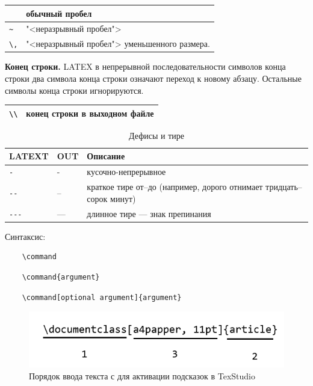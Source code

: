 \begin{table}[h]
    \begin{tabular}{|l|p{}|}
        \hline
                  & обычный пробел \\ \hline
        \verb|~|  & "<неразрывный пробел">\\ \hline
        \verb|\,| & "<неразрывный пробел"> уменьшенного размера.\\
        \hline
    \end{tabular}
\end{table}

\textbf{Конец строки.} LATEX в непрерывной последовательности символов конца строки два символа конца строки означают переход к новому абзацу. Остальные символы конца строки игнорируются.

\begin{table}[ht]
    \begin{tabular}{|l|p{}|}
        \hline
        \verb|\\| & конец строки в выходном файле\\
        \hline
    \end{tabular}
\end{table}

\begin{table}[ht]
    \caption{Дефисы и тире}
    \begin{tabular}{|l|l|p{}|}
        \hline
        \textbf{LATEXT} &
        \textbf{OUT}    &
        \textbf{Описание} \\ \hline
        \verb|-| & - & кусочно-непрерывное \\ \hline
        \verb|--| & -- & краткое тире от--до (например, дорого отнимает тридцать--сорок минут) \\ \hline
        \verb|---| & --- & длинное тире --- знак препинания \\ \hline
    \end{tabular}
\end{table}

\bigskip


\bigskip


Синтаксис:
\begin{verbatim}
    \command
\end{verbatim}

\begin{verbatim}
    \command{argument}
\end{verbatim}

\begin{verbatim}
    \command[optional argument]{argument}
\end{verbatim}


\begin{figure}[h]
    \includegraphics{fig/input_sequence_for_help.png}
    \caption{Порядок ввода текста с для активации подсказок в TexStudio}
\end{figure}


\clearpage